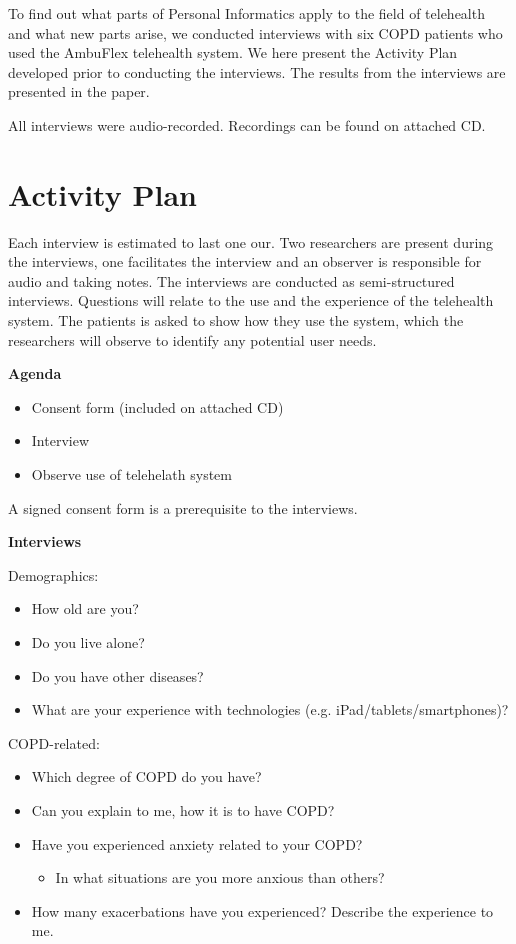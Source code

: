 To find out what parts of Personal Informatics apply to the field of telehealth and what new parts arise, we conducted interviews with six COPD patients who used the AmbuFlex telehealth system. We here present the Activity Plan developed prior to conducting the interviews. The results from the interviews are presented in the paper.


All interviews were audio-recorded. Recordings can be found on attached CD.

\section{Activity Plan}
Each interview is estimated to last one our. Two researchers are present during the interviews, one facilitates the interview and an observer is responsible for audio and taking notes. The interviews are conducted as semi-structured interviews. Questions will relate to the use and the experience of the telehealth system. The patients is asked to show how they use the system, which the researchers will observe to identify any potential user needs.

\textbf{Agenda}
\begin{itemize}
	\item Consent form (included on attached CD)
	\item Interview
	\item Observe use of telehelath system
\end{itemize}

A signed consent form is a prerequisite to the interviews.

\textbf{Interviews}

Demographics:
\begin{itemize}
	\item How old are you?
	\item Do you live alone?
	\item Do you have other diseases?
	\item What are your experience with technologies (e.g. iPad/tablets/smartphones)?
\end{itemize}

COPD-related:
\begin{itemize}
	\item Which degree of COPD do you have?
	\item Can you explain to me, how it is to have COPD?
	\item Have you experienced anxiety related to your COPD?
	\begin{itemize}
		\item In what situations are you more anxious than others?
	\end{itemize}
	\item How many exacerbations have you experienced? Describe the experience to me.
\end{itemize}


